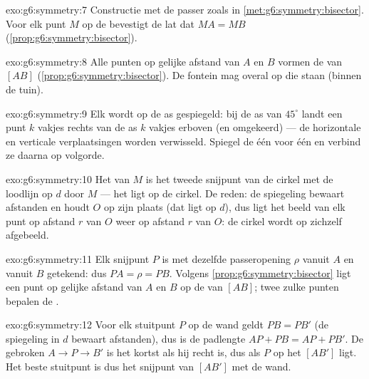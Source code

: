 \begin{solution}{exo:g6:symmetry:7}
Constructie met de passer zoals in \cref{met:g6:symmetry:bisector}. Voor elk
punt $M$ op de  bevestigt de lat dat $MA = MB$
(\cref{prop:g6:symmetry:bisector}).
\end{solution}

\begin{solution}{exo:g6:symmetry:8}
Alle punten op gelijke afstand van $A$ en $B$ vormen de  van
$[AB]$ (\cref{prop:g6:symmetry:bisector}). De fontein mag overal op die 
staan (binnen de tuin).
\end{solution}

\begin{solution}{exo:g6:symmetry:9}
Elk  wordt  op de as gespiegeld: bij de as van $45^\circ$ landt
een punt $k$ vakjes rechts van de as $k$ vakjes erboven (en omgekeerd) --- de
horizontale en verticale verplaatsingen worden verwisseld. Spiegel de 
één voor één en verbind ze daarna op volgorde.
\end{solution}

\begin{solution}{exo:g6:symmetry:10}
Het  van $M$ is het tweede snijpunt van de cirkel met de loodlijn op
$d$ door $M$ --- het ligt op de cirkel. De reden: de spiegeling bewaart
afstanden en houdt $O$ op zijn plaats (dat ligt op $d$), dus ligt het beeld van
elk punt op afstand $r$ van $O$ weer op afstand $r$ van $O$: de cirkel wordt op
zichzelf afgebeeld.
\end{solution}

\begin{solution}{exo:g6:symmetry:11}
Elk snijpunt $P$ is met dezelfde passeropening $\rho$ vanuit $A$ en vanuit $B$
getekend: dus $PA = \rho = PB$. Volgens
\cref{prop:g6:symmetry:bisector} ligt een punt op gelijke afstand van $A$ en
$B$ op de  van $[AB]$; twee zulke punten bepalen de .
\end{solution}

\begin{solution}{exo:g6:symmetry:12}
Voor elk stuitpunt $P$ op de wand geldt $PB = PB'$ (de spiegeling in $d$ bewaart
afstanden), dus is de padlengte $AP + PB = AP + PB'$. De gebroken 
$A \to P \to B'$ is het kortst als hij recht is, dus als $P$ op het 
$[AB']$ ligt. Het beste stuitpunt is dus het snijpunt van $[AB']$ met de wand.
\end{solution}

